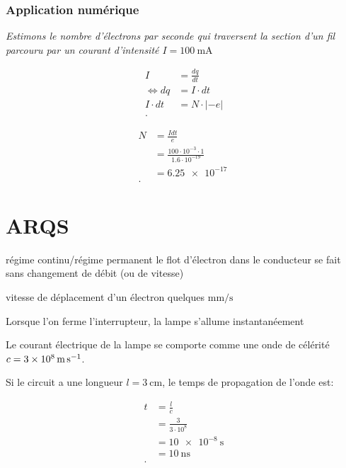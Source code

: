 \documentclass{article}
\newenvironment{definition}{\begin{description}[leftmargin=!,labelwidth=\widthof{\bfseries Lorem ipsum dolor}]}{\end{description}}
\begin{document}
\subsubsection{Application numérique}
\emph{Estimons le nombre d'électrons par seconde qui traversent la section d'un fil parcouru par un courant d'intensité $I = \SI{100}{\milli\ampere}$} 

\begin{align*}
	I &= \frac{dq}{dt} \\
	\iff dq &= I\cdot dt \\
	I\cdot dt &= N\cdot |-e| \\
.\end{align*}

\begin{align*}
	N &= \frac{Idt}{e} \\
	&= \frac{100\cdot 10^{-3}\cdot 1}{1.6\cdot 10^{-19}} \\
	&= \SI{6.25e-17}{} \\
.\end{align*}

\section{ARQS}
\begin{definition}
	\item[régime continu/régime permanent] le flot d'électron dans le conducteur se fait sans changement de débit (ou de vitesse)
	\item[vitesse de déplacement d'un électron] quelques $\si{\milli\meter\per\second}$
\end{definition}


Lorsque l'on ferme l'interrupteur, la lampe s'allume instantanéement

Le courant électrique de la lampe se comporte comme une onde de célérité $c = \SI{3E8}{\meter\per\second}$.

Si le circuit a une longueur $l=\SI{3}{\centi\meter}$, le temps de propagation de l'onde est:

\begin{align*}
	t &= \frac{l}{c} \\
	&= \frac{3}{3\cdot 10^8} \\
	&= \SI{10e-8}{\second} \\
	&= \SI{10}{\nano\second} \\
.\end{align*}
\end{document}
